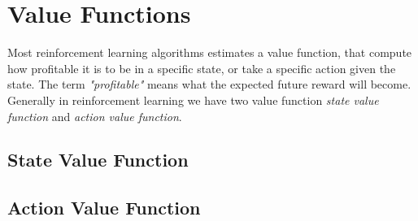 \documentclass[11pt]{article}
\begin{document}
\maketitle

\section{Value Functions}

Most reinforcement learning algorithms estimates a value function, that compute how profitable it is to be in a specific state, or take a specific action given the state. The term \textit{"profitable"} means what the expected future reward will become. Generally in reinforcement learning we have two value function \textit{state value function} and \textit{action value function}.

\subsection{State Value Function}

\subsection{Action Value Function}
\end{document}
